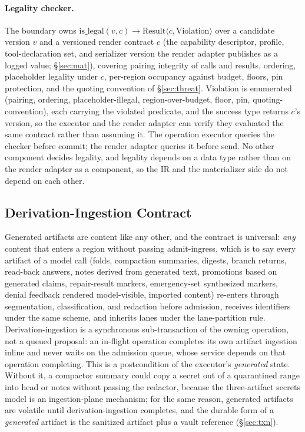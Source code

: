 \documentclass[11pt]{article}
\begin{document}
\paragraph{Legality checker.} The boundary owns $\mathrm{is\_legal}(v, c) \to \mathrm{Result}\langle c, \mathrm{Violation} \rangle$ over a candidate version $v$ and a versioned render contract $c$ (the capability descriptor, profile, tool-declaration set, and serializer version the render adapter publishes as a logged value; \S\ref{sec:mat}), covering pairing integrity of calls and results, ordering, placeholder legality under $c$, per-region occupancy against budget, floors, pin protection, and the quoting convention of \S\ref{sec:threat}. $\mathrm{Violation}$ is enumerated (pairing, ordering, placeholder-illegal, region-over-budget, floor, pin, quoting-convention), each carrying the violated predicate, and the success type returns $c$'s version, so the executor and the render adapter can verify they evaluated the same contract rather than assuming it. The operation executor queries the checker before commit; the render adapter queries it before send. No other component decides legality, and legality depends on a data type rather than on the render adapter as a component, so the IR and the materializer side do not depend on each other.

\subsection{Derivation-Ingestion Contract}
\label{sec:derivation}
Generated artifacts are content like any other, and the contract is universal: \emph{any} content that enters a region without passing admit-ingress, which is to say every artifact of a model call (folds, compaction summaries, digests, branch returns, read-back answers, notes derived from generated text, promotions based on generated claims, repair-result markers, emergency-set synthesized markers, denial feedback rendered model-visible, imported content) re-enters through segmentation, classification, and redaction before admission, receives identifiers under the same scheme, and inherits lanes under the lane-partition rule. Derivation-ingestion is a synchronous sub-transaction of the owning operation, not a queued proposal: an in-flight operation completes its own artifact ingestion inline and never waits on the admission queue, whose service depends on that operation completing. This is a postcondition of the executor's \emph{generated} state. Without it, a compactor summary could copy a secret out of a quarantined range into head or notes without passing the redactor, because the three-artifact secrets model is an ingestion-plane mechanism; for the same reason, generated artifacts are volatile until derivation-ingestion completes, and the durable form of a \emph{generated} artifact is the sanitized artifact plus a vault reference (\S\ref{sec:txn}).
\end{document}
